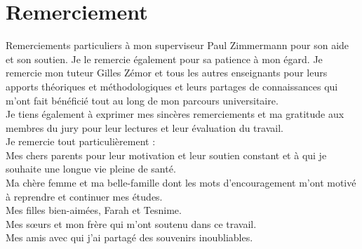\section*{Remerciement}
Remerciements particuliers à mon superviseur Paul Zimmermann pour son aide et son soutien. Je le remercie également pour sa patience à mon égard.
Je remercie mon tuteur Gilles Zémor et tous les autres enseignants pour leurs apports théoriques et méthodologiques et leurs partages de connaissances qui m'ont fait bénéficié tout au long de mon parcours universitaire.\\
Je tiens également à exprimer mes sincères remerciements et ma gratitude aux membres du jury pour leur lectures et leur évaluation du travail.\\
Je remercie tout particulièrement :\\
Mes chers parents pour leur motivation et leur soutien constant et à qui je souhaite une longue vie pleine de santé.\\
Ma chère femme et ma belle-famille dont les mots d'encouragement m'ont motivé à reprendre et continuer mes études.\\
Mes filles bien-aimées, Farah et Tesnime.\\
Mes sœurs et mon frère qui m'ont soutenu dans ce travail. \\
Mes amis avec qui j'ai partagé des souvenirs inoubliables.
\newpage